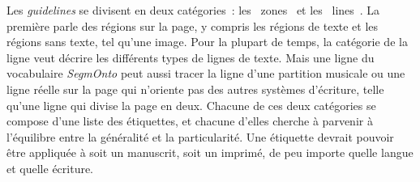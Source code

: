 \documentclass[class=article, crop=false]{standalone}
\begin{document}
Les \textit{guidelines} se divisent en deux catégories~: les \og~zones~\fg{} et les \og~lines~\fg{}. La première parle des régions sur la page, y compris les régions de texte et les régions sans texte, tel qu'une image. Pour la plupart de temps, la catégorie de la ligne veut décrire les différents types de lignes de texte. Mais une ligne du vocabulaire \textit{SegmOnto} peut aussi tracer la ligne d'une partition musicale ou une ligne réelle sur la page qui n'oriente pas des autres systèmes d'écriture, telle qu'une ligne qui divise la page en deux. Chacune de ces deux catégories se compose d'une liste des étiquettes, et chacune d'elles cherche à parvenir à l'équilibre entre la généralité et la particularité. Une étiquette devrait pouvoir être appliquée à soit un manuscrit, soit un imprimé, de peu importe quelle langue et quelle écriture.
\end{document}
